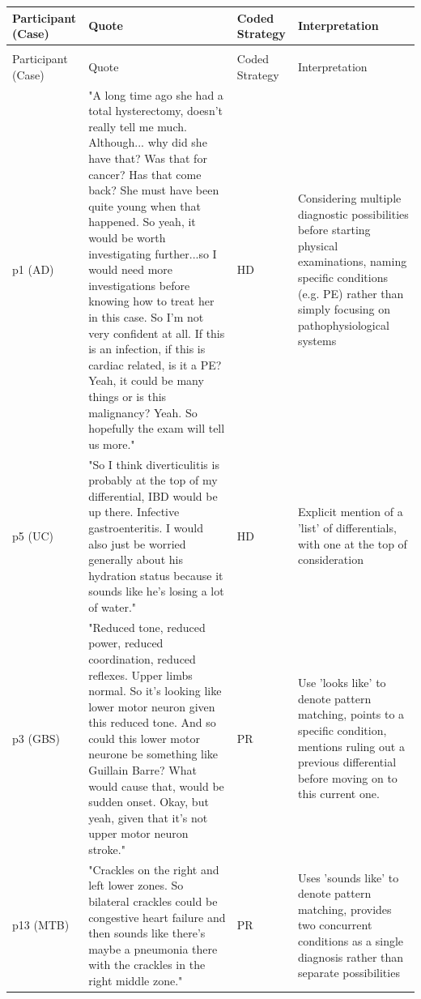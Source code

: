 \documentclass[a4paper, nobind]{templates/ociamthesis}
\begin{document}
\begin{longtable}{>{\raggedright\arraybackslash}p{6em}|>{\raggedright\arraybackslash}p{15em}|>{\raggedright\arraybackslash}p{4em}|>{\raggedright\arraybackslash}p{9em}}
\hline
Participant (Case) & Quote & Coded Strategy & Interpretation\\
\hline
\endfirsthead
\multicolumn{4}{@{}l}{\textit{(continued)}}\\
\hline
Participant (Case) & Quote & Coded Strategy & Interpretation\\
\hline
\endhead
p1 (AD) & "A long time ago she had a total hysterectomy, doesn't really tell me much. Although... why did she have that? Was that for cancer? Has that come back? She must have been quite young when that happened. So yeah, it would be worth investigating further...so I would need more investigations before knowing how to treat her in this case. So I'm not very confident at all. If this is an infection, if this is cardiac related, is it a PE? Yeah, it could be many things or is this malignancy? Yeah. So hopefully the exam will tell us more." & HD & Considering multiple diagnostic possibilities before starting physical examinations, naming specific conditions (e.g. PE) rather than simply focusing on pathophysiological systems\\
\hline
p5 (UC) & "So I think diverticulitis is probably at the top of my differential, IBD would be up there. Infective gastroenteritis. I would also just be worried generally about his hydration status because it sounds like he's losing a lot of water." & HD & Explicit mention of a 'list' of differentials, with one at the top of consideration\\
\hline
p3 (GBS) & "Reduced tone, reduced power, reduced coordination, reduced reflexes. Upper limbs normal. So it's looking like lower motor neuron given this reduced tone. And so could this lower motor neurone be something like Guillain Barre? What would cause that, would be sudden onset. Okay, but yeah, given that it's not upper motor neuron stroke." & PR & Use 'looks like' to denote pattern matching, points to a specific condition, mentions ruling out a previous differential before moving on to this current one.\\
\hline
p13 (MTB) & "Crackles on the right and left lower zones. So bilateral crackles could be congestive heart failure and then sounds like there’s maybe a pneumonia there with the crackles in the right middle zone." & PR & Uses 'sounds like' to denote pattern matching, provides two concurrent conditions as a single diagnosis rather than separate possibilities\\

\end{longtable}
\end{document}

